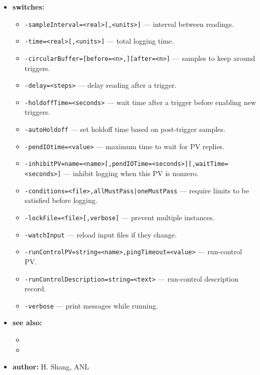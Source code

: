 \begin{itemize}
\item {\bf switches:}
    \begin{itemize}
    \item {\tt -sampleInterval=<real>[,<units>]} --- interval between readings.
    \item {\tt -time=<real>[,<units>]} --- total logging time.
    \item {\tt -circularBuffer=[before=<n>,][after=<n>]} --- samples to keep around triggers.
    \item {\tt -delay=<steps>} --- delay reading after a trigger.
    \item {\tt -holdoffTime=<seconds>} --- wait time after a trigger before enabling new triggers.
    \item {\tt -autoHoldoff} --- set holdoff time based on post-trigger samples.
    \item {\tt -pendIOtime=<value>} --- maximum time to wait for PV replies.
    \item {\tt -inhibitPV=name=<name>[,pendIOTime=<seconds>][,waitTime=<seconds>]} --- inhibit logging when this PV is nonzero.
    \item {\tt -conditions=<file>,{allMustPass|oneMustPass}} --- require limits to be satisfied before logging.
    \item {\tt -lockFile=<file>[,verbose]} --- prevent multiple instances.
    \item {\tt -watchInput} --- reload input files if they change.
    \item {\tt -runControlPV=string=<name>,pingTimeout=<value>} --- run-control PV.
    \item {\tt -runControlDescription=string=<text>} --- run-control description record.
    \item {\tt -verbose} --- print messages while running.
    \end{itemize}

\item {\bf see also:}
    \begin{itemize}
    \item {}
    \item {}
    \end{itemize}

\item {\bf author:} H. Shang, ANL
\end{itemize}

